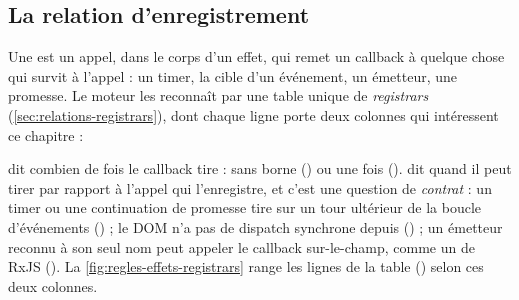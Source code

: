 \subsection{La relation d'enregistrement}

Une  est un appel, dans le corps d'un effet, qui remet un callback à quelque chose qui survit à l'appel : un timer, la cible d'un événement, un émetteur, une promesse. Le moteur les reconnaît par une table unique de \emph{registrars} (\cref{sec:relations-registrars}), dont chaque ligne porte deux colonnes qui intéressent ce chapitre :


 dit combien de fois le callback tire : sans borne () ou une fois ().  dit quand il peut tirer par rapport à l'appel qui l'enregistre, et c'est une question de \emph{contrat} : un timer ou une continuation de promesse tire sur un tour ultérieur de la boucle d'événements () ; le DOM n'a pas de dispatch synchrone depuis  () ; un émetteur reconnu à son seul nom peut appeler le callback sur-le-champ, comme un  de RxJS (). La \cref{fig:regles-effets-registrars} range les lignes de la table  () selon ces deux colonnes.

